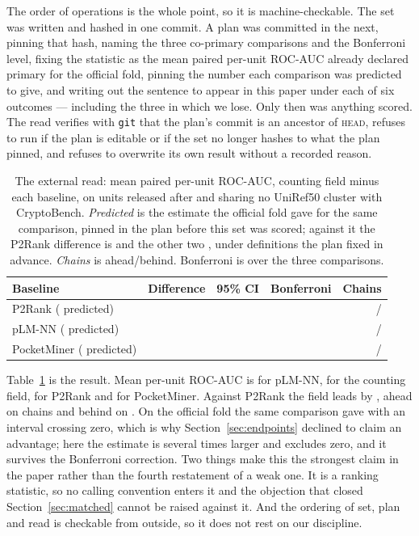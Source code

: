 \documentclass[11pt]{article}
\begin{document}
The order of operations is the whole point, so it is machine-checkable. The set
was written and hashed in one commit. A plan was committed in the next, pinning
that hash, naming the three co-primary comparisons and the Bonferroni level,
fixing the statistic as the mean paired per-unit ROC-AUC already declared primary
for the official fold, pinning the number each comparison was predicted to give,
and writing out the sentence to appear in this paper under each of six outcomes
--- including the three in which we lose. Only then was anything scored. The read
verifies with \texttt{git} that the plan's commit is an ancestor of \textsc{head},
refuses to run if the plan is editable or if the set no longer hashes to what the
plan pinned, and refuses to overwrite its own result without a recorded reason.

\begin{table}[t]
\centering
\small
\caption{The external read: mean paired per-unit ROC-AUC, counting field minus
each baseline, on \ExtN{} units released after \ExtCutoff{} and sharing no
UniRef50 cluster with CryptoBench. \emph{Predicted} is the estimate the official
fold gave for the same comparison, pinned in the plan before this set was scored;
against it the P2Rank difference is \ExtVerdictPtwoR{} and the other two
\ExtVerdictPlm{}, under definitions the plan fixed in advance. \emph{Chains} is
ahead/behind. Bonferroni is over the three comparisons.}
\label{tab:external}
\begin{tabular}{lrrrr}
\toprule
Baseline & Difference & 95\% CI & Bonferroni & Chains \\
\midrule
P2Rank (\ExtOldPtwoR{} predicted) & \ExtAucPtwoR{} & \ExtAucCIPtwoR{} &
  \ExtAucBonfPtwoR{} & \ExtWinPtwoR{}/\ExtLossPtwoR{} \\
pLM-NN (\ExtOldPlm{} predicted) & \ExtAucPlm{} & \ExtAucCIPlm{} &
  \ExtAucBonfPlm{} & \ExtWinPlm{}/\ExtLossPlm{} \\
PocketMiner (\ExtOldPm{} predicted) & \ExtAucPm{} & \ExtAucCIPm{} &
  \ExtAucBonfPm{} & \ExtWinPm{}/\ExtLossPm{} \\
\bottomrule
\end{tabular}
\end{table}

Table~\ref{tab:external} is the result. Mean per-unit ROC-AUC is \ExtLevelPlm{}
for pLM-NN, \ExtLevelOurs{} for the counting field, \ExtLevelPtwoR{} for P2Rank
and \ExtLevelPm{} for PocketMiner. Against P2Rank the field leads by
\ExtAucPtwoR{} \ExtAucCIPtwoR{}, ahead on \ExtWinPtwoR{} chains and behind on
\ExtLossPtwoR{}. On the official fold the same comparison gave \ExtOldPtwoR{}
with an interval crossing zero, which is why Section~\ref{sec:endpoints} declined
to claim an advantage; here the estimate is several times larger and excludes
zero, and it survives the Bonferroni correction. Two things make this the
strongest claim in the paper rather than the fourth restatement of a weak one.
It is a ranking statistic, so no calling convention enters it and the objection
that closed Section~\ref{sec:matched} cannot be raised against it. And the
ordering of set, plan and read is checkable from outside, so it does not rest on
our discipline.
\end{document}
